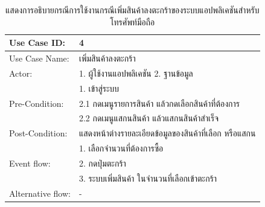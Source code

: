 \begin{table}[htbp]
  \centering
  \caption{แสดงการอธิบายกรณีการใช้งานกรณีเพิ่มสินค้าลงตะกร้าของระบบแอปพลิเคชันสำหรับโทรศัพท์มือถือ}
  \label{tab:example}
  \begin{tabularx}{\textwidth}{|p{3cm}|X|}
    \hline
    \multirow{1}{3cm}{Use Case ID:}      & 4                                           \\
    \hline
    \multirow{1}{3cm}{Use Case Name:}    & เพิ่มสินค้าลงตะกร้า                              \\
    \hline
    \multirow{1}{3cm}{Actor:}            & 1. ผู้ใช้งานแอปพลิเคชัน 2. ฐานข้อมูล               \\
    \hline
    \multirow{3}{3cm}{Pre-Condition:}    & 1. เข้าสู่ระบบ                                 \\ & 2.1 กดเมนูรายการสินค้า แล้วกดเลือกสินค้าที่ต้องการ \\
                                         & 2.2 กดเมนูแสกนสินค้า แล้วแสกนสินค้าสำเร็จ           \\
    \hline
    \multirow{1}{3cm}{Post-Condition:}   & แสดงหน้าต่างรายละเอียดข้อมูลของสินค้าที่เลือก หรือแสกน \\
    \hline
    \multirow{3}{3cm}{Event flow:}       & 1. เลือกจำนวนที่ต้องการซื้อ                        \\
                                         & 2. กดปุ่มตะกร้า                                \\ & 3. ระบบเพิ่มสินค้า ในจำนวนที่เลือกเข้าตะกร้า \\
    \hline
    \multirow{1}{3cm}{Alternative flow:} & -                                           \\
    \hline
  \end{tabularx}
\end{table}

